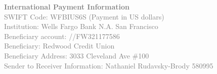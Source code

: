 \documentclass[11pt]{article}
\begin{document}
\vspace{\fill}



\textcolor{gray}{\small
\textbf{International Payment Information}\\
SWIFT Code: WFBIUS6S (Payment in US dollars) \\
Institution: Wells Fargo Bank N.A. San Francisco\\
Beneficiary account: //FW321177586\\
Beneficiary: Redwood Credit Union\\
Beneficiary Address: 3033 Cleveland Ave \#100\\
Sender to Receiver Information: Nathaniel Rudavsky-Brody 580995
}
\end{document}
